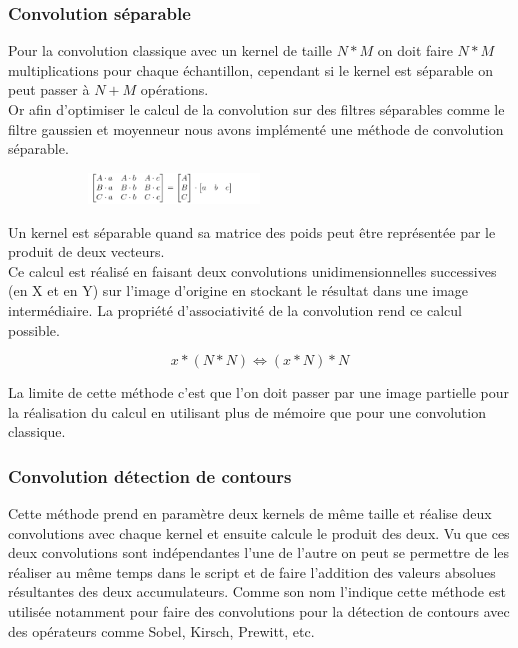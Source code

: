     \subsubsection*{Convolution séparable}

        Pour la convolution classique avec un kernel de taille $N*M$ on doit faire $N*M$ multiplications pour chaque échantillon,
        cependant si le kernel est séparable on peut passer à $N+M$ opérations.
        \\

        Or afin d'optimiser le calcul de la convolution sur des filtres séparables comme le filtre gaussien et moyenneur nous avons implémenté une
        méthode de convolution séparable.
        
        \begin{figure}[!h]
            \centering
            \begin{subfigure}[b]{1\textwidth}
                \centering
                \includegraphics[width=0.5\textwidth]{report_src/separableConv1.png}
            \end{subfigure}
        \end{figure}

        Un kernel est séparable quand sa matrice des poids peut être représentée par le produit de deux vecteurs.
        \\

        Ce calcul est réalisé en faisant deux convolutions unidimensionnelles successives (en X et en Y) sur l'image d'origine en stockant le résultat dans une image intermédiaire.
        La propriété d'associativité de la convolution rend ce calcul possible.

        \[
            x * (N * N)  \iff (x * N) * N
        \]

        La limite de cette méthode c'est que l'on doit passer par une image partielle pour la réalisation du calcul en
        utilisant plus de mémoire que pour une convolution classique.



    \subsubsection*{Convolution détection de contours}

        Cette méthode prend en paramètre deux kernels de même taille et réalise deux convolutions avec chaque kernel et ensuite calcule le produit des deux.
        Vu que ces deux convolutions sont indépendantes l'une de l'autre on peut se permettre de les réaliser au même temps dans le script et de faire l'addition
        des valeurs absolues résultantes des deux accumulateurs. Comme son nom l'indique cette méthode est utilisée notamment pour faire des convolutions pour la détection de contours
        avec des opérateurs comme Sobel, Kirsch, Prewitt, etc.
    \\


